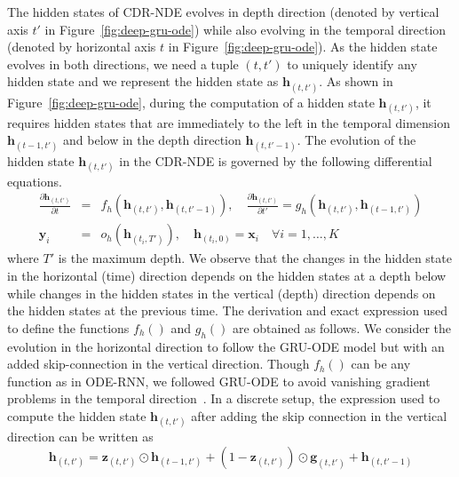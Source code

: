 \documentclass{article} %
\newcommand{\bx}{\mathbf{x}}
\newcommand{\bz}{\mathbf{z}}
\newcommand{\bg}{\mathbf{g}}
\newcommand{\by}{\mathbf{y}}
\newcommand{\bh}{\mathbf{h}}
\begin{document}
The  hidden states of CDR-NDE  evolves in depth direction (denoted by vertical axis $t'$ in Figure~\ref{fig:deep-gru-ode}) while also evolving in the  temporal direction (denoted by horizontal axis  $t$ in  Figure~\ref{fig:deep-gru-ode}).  As the hidden state evolves in both directions,  we need a tuple $(t,t')$ to uniquely identify any hidden state and we represent the hidden state as $\bh_{(t,t')}$. 
As shown in Figure~\ref{fig:deep-gru-ode}, during  the computation of a hidden state  $\bh_{(t,t')}$, it requires hidden states that are immediately to the left in the temporal dimension $\bh_{(t-1,t')}$  and below in the depth direction $\bh_{(t, t'-1)}$. The evolution of the  hidden state  $\bh_{(t,t')}$ in the CDR-NDE is governed by the following differential equations. 
\begin{eqnarray}
   \frac{\partial \bh_{(t,t')}}{\partial t} &=& f_h(\bh_{(t,t')},\bh_{(t,t'-1)})  , \quad
   \frac{\partial \bh_{(t,t')}}{\partial t'} = g_h(\bh_{(t,t')},\bh_{(t-1,t')})\\
   \by_i &=& o_h(\bh_{(t_i,T')})  , \quad
    \bh_{(t_i,0)} = \bx_i \quad \forall i=1,\ldots,K 
\end{eqnarray}
where $T'$ is the maximum depth. We observe that the changes in the hidden state in the horizontal (time) direction depends on the hidden states at a depth below while changes in the hidden states in the vertical (depth) direction depends on the hidden states at the previous time.  The derivation and  exact expression used to define the functions $f_h()$ and $g_h()$ are obtained as follows. We consider the evolution in the horizontal direction to follow the GRU-ODE model but with an added skip-connection in the vertical direction. Though $f_h()$ can be any function as in ODE-RNN, we followed GRU-ODE to avoid vanishing gradient problems in the temporal direction~\citep{de2019gru}. In a discrete setup, the expression used to compute the hidden state $\bh_{(t,t')}$ after adding the skip connection in the vertical direction can be written as %
\begin{equation}
    \bh_{(t,t')}  = \bz_{(t,t')} \odot \bh_{(t-1,t')}  + (1-\bz_{(t,t')})\odot\bg_{(t,t')} +  \bh_{(t,t'-1)}
    \label{eq:gru-ode-deep}
\end{equation}
\end{document}

